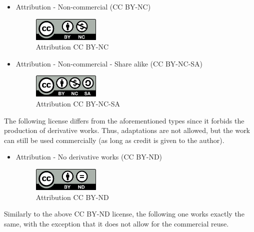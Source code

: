  \begin{itemize}
    \item Attribution - Non-commercial (CC BY-NC)

    \begin{figure}[H]
    \centering
    \includegraphics[width=0.3\textwidth]{images/by-nc.png}
    \caption{Attribution CC BY-NC}
    \label{fig:ccBYNC}
    \end{figure}
    
    \item Attribution - Non-commercial - Share alike (CC BY-NC-SA)

    \begin{figure}[H]
    \centering
    \includegraphics[width=0.3\textwidth]{images/by-nc-sa.png}
    \caption{Attribution CC BY-NC-SA}
    \label{fig:ccBYNCSA}
    \end{figure}
 \end{itemize}
 
The following license differs from the aforementioned types since it forbids the production of derivative works. Thus, adaptations are not allowed, but the work can still be used commercially (as long as credit is given to the author).

\begin{itemize}
    \item Attribution - No derivative works (CC BY-ND)

    \begin{figure}[H]
    \centering
    \includegraphics[width=0.3\textwidth]{images/by-nd.png}
    \caption{Attribution CC BY-ND}
    \label{fig:ccBYND}
    \end{figure}
\end{itemize}

Similarly to the above CC BY-ND license, the following one works exactly the same, with the exception that it does not allow for the commercial reuse.

